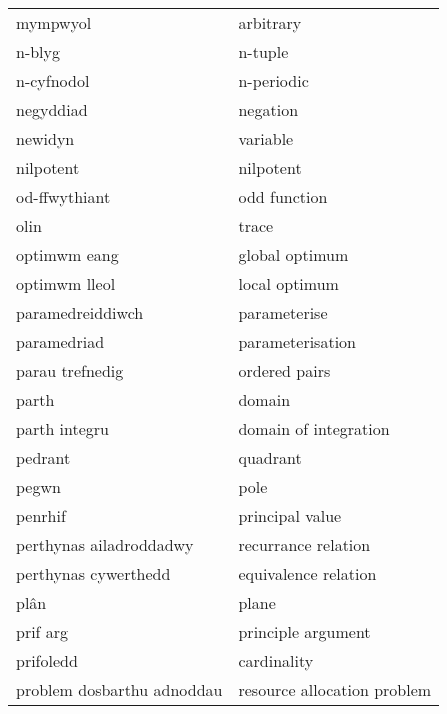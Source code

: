 \begin{supertabular}{p{0.22\textwidth}p{0.22\textwidth}}
                       mympwyol &                        arbitrary \\
                         n-blyg &                          n-tuple \\
                     n-cyfnodol &                       n-periodic \\
                      negyddiad &                         negation \\
                        newidyn &                         variable \\
                      nilpotent &                        nilpotent \\
                  od-ffwythiant &                     odd function \\
                           olin &                            trace \\
                   optimwm eang &                   global optimum \\
                  optimwm lleol &                    local optimum \\
               paramedreiddiwch &                     parameterise \\
                    paramedriad &                 parameterisation \\
                parau trefnedig &                    ordered pairs \\
                          parth &                           domain \\
                  parth integru &            domain of integration \\
                        pedrant &                         quadrant \\
                          pegwn &                             pole \\
                        penrhif &                  principal value \\
        perthynas ailadroddadwy &              recurrance relation \\
           perthynas cywerthedd &             equivalence relation \\
                           plân &                            plane \\
                       prif arg &               principle argument \\
                      prifoledd &                      cardinality \\
     problem dosbarthu adnoddau &      resource allocation problem \\

\end{supertabular}
